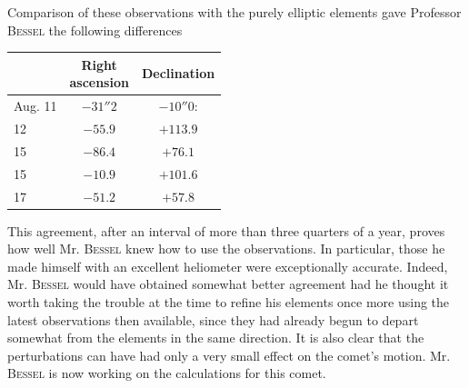 \par\indent Comparison of these observations with the purely elliptic elements gave Professor \textsc{Bessel} the following differences
\begin{center}\fontsize{10}{12}\selectfont\setlength{\tabcolsep}{8pt}\renewcommand{\arraystretch}{1.15}\begin{tabular}{l|c|c}
& \shortstack{Right\\ascension} & Declination\\\hline
Aug. 11 & $-31''2$ & $-10''0$:\\
12 & $-55.9$ & $+113.9$\\
15 & $-86.4$ & $+76.1$\\
15 & $-10.9$ & $+101.6$\\
17 & $-51.2$ & $+57.8$\\
\end{tabular}\end{center}

\par\indent This agreement, after an interval of more than three quarters of a year, proves how well Mr. \textsc{Bessel} knew how to use the observations. In particular, those he made himself with an excellent heliometer were exceptionally accurate. Indeed, Mr. \textsc{Bessel} would have obtained somewhat better agreement had he thought it worth taking the trouble at the time to refine his elements once more using the latest observations then available, since they had already begun to depart somewhat from the elements in the same direction. It is also clear that the perturbations can have had only a very small effect on the comet’s motion. Mr. \textsc{Bessel} is now working on the calculations for this comet.
